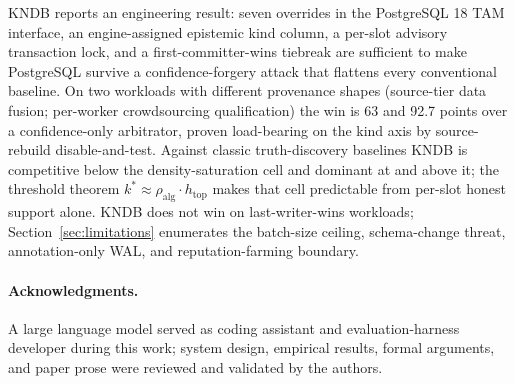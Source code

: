 \documentclass[sigconf, nonacm]{acmart}
\begin{document}
KNDB reports an engineering result: seven overrides in the PostgreSQL 18 TAM interface, an engine-assigned epistemic kind column, a per-slot advisory transaction lock, and a first-committer-wins tiebreak are sufficient to make PostgreSQL survive a confidence-forgery attack that flattens every conventional baseline. On two workloads with different provenance shapes (source-tier data fusion; per-worker crowdsourcing qualification) the win is 63 and 92.7 points over a confidence-only arbitrator, proven load-bearing on the kind axis by source-rebuild disable-and-test. Against classic truth-discovery baselines KNDB is competitive below the density-saturation cell and dominant at and above it; the threshold theorem $k^{*} \approx \rho_{\text{alg}} \cdot h_{\text{top}}$ makes that cell predictable from per-slot honest support alone. KNDB does not win on last-writer-wins workloads; Section~\ref{sec:limitations} enumerates the batch-size ceiling, schema-change threat, annotation-only WAL, and reputation-farming boundary.

\vspace{-\baselineskip}
\paragraph*{Acknowledgments.}
A large language model served as coding assistant and evaluation-harness developer during this work; system design, empirical results, formal arguments, and paper prose were reviewed and validated by the authors.



\end{document}
